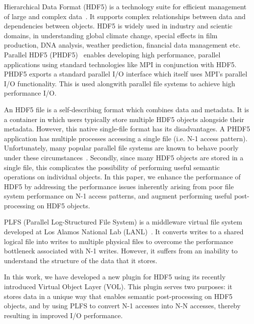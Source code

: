 Hierarchical Data Format (HDF5) is a technology suite for efficient management of large and complex data~\cite{hdf5_ad11}. It supports complex relationships between data and dependencies between objects. HDF5 is widely used in industry and scientic domains, in understanding global climate change, special effects in film production, DNA analysis, weather prediction, financial data management etc.~\cite{hdf5_users}
Parallel HDF5 (PHDF5)~\cite{phdf5} enables developing high performance, parallel applications using standard technologies like MPI in conjunction with HDF5. 
PHDF5 exports a standard parallel I/O interface which itself uses MPI's parallel I/O functionality. This is used alongwith parallel file systems to achieve high performance I/O.

An HDF5 file is a self-describing format which combines data and metadata. It is a container in which users typically store multiple HDF5 objects alongside their metadata. 
However, this native single-file format has its disadvantages. A PHDF5 application has multiple processes accessing a single file (i.e. N-1 access pattern). Unfortunately, many popular parallel file systems are known to behave poorly under these circumstances~\cite{lustre_perf}\cite{nersc_io}. Secondly, since many HDF5 objects are stored in a single file, this complicates the possibility of performing useful semantic operations on individual objects. In this paper, we enhance the performance of HDF5 by addressing the performance issues inherently arising from poor file system performance on N-1 access patterns, and augment performing  useful post-processing on HDF5 objects. 

PLFS (Parallel Log-Structured File System) is a middleware virtual file system developed at Los Alamos National Lab (LANL)~\cite{plfs_sc09}. It converts writes to a shared logical file into writes to multiple physical files to overcome the performance bottleneck associated with N-1 writes. However, it suffers from an inability to understand the structure of the data that it stores.

In this work, we have developed a new plugin for HDF5 using its recently introduced Virtual Object Layer (VOL).  
This plugin serves two purposes: it stores data in a unique way that enables semantic post-processing on HDF5 objects, and by using PLFS to convert N-1 accesses into N-N accesses, thereby resulting in improved I/O performance.


